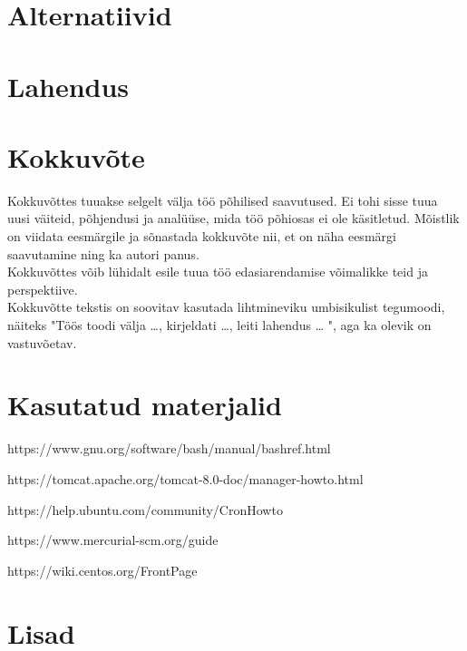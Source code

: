 \documentclass[12pt]{report}
\begin{document}
  \newpage
  
  \section{Alternatiivid}
  
  \newpage
  
  \section{Lahendus}
  
  \newpage
  
  \section*{Kokkuvõte}
  \label{kokkuvote}

Kokkuvõttes tuuakse selgelt välja töö põhilised saavutused. Ei tohi sisse tuua uusi väiteid, põhjendusi ja analüüse, mida töö põhiosas ei ole käsitletud. Mõistlik on viidata eesmärgile ja sõnastada kokkuvõte nii, et on näha eesmärgi saavutamine ning ka autori panus.\\

Kokkuvõttes võib lühidalt esile tuua töö edasiarendamise võimalikke teid ja perspektiive.\\

Kokkuvõtte tekstis on soovitav kasutada lihtmineviku umbisikulist tegumoodi, näiteks "Töös toodi välja …, kirjeldati …, leiti lahendus … ", aga ka olevik on vastuvõetav.

  \newpage
  
  \section*{Kasutatud materjalid}
  \label{kasutatud-materjalid}
  
  https://www.gnu.org/software/bash/manual/bashref.html
  
  https://tomcat.apache.org/tomcat-8.0-doc/manager-howto.html
  
  https://help.ubuntu.com/community/CronHowto
  
  https://www.mercurial-scm.org/guide
  
  https://wiki.centos.org/FrontPage

  \newpage
  
  \section*{Lisad}
  \label{lisad}
\end{document}
